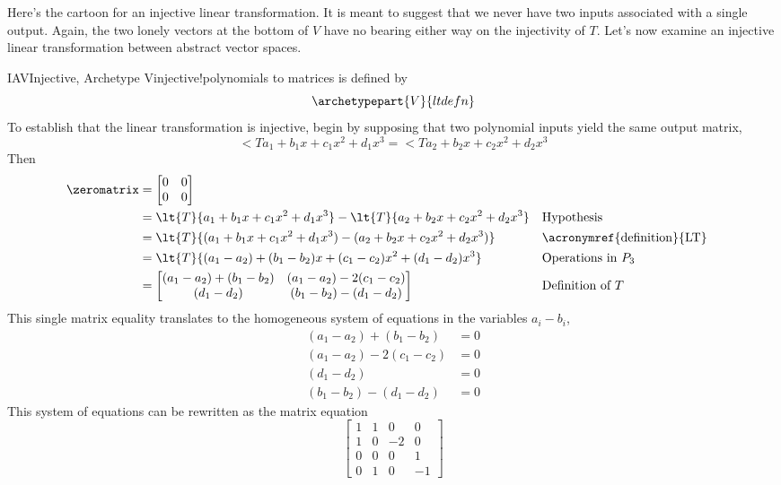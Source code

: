 %
Here's the cartoon for an injective linear transformation.  It is meant to suggest that we never have two inputs associated with a single output.  Again, the two lonely vectors at the bottom of $V$ have no bearing either way on the injectivity of $T$.
%
%
Let's now examine an injective linear transformation between abstract vector spaces.
%
\begin{example}{IAV}{Injective, Archetype V}{injective!polynomials to matrices}
 is defined by
%
\begin{equation*}
\archetypepart{V}{ltdefn}
\end{equation*}
%
To establish that the linear transformation is injective, begin by supposing that two polynomial inputs yield the same output matrix, 
%
\begin{equation*}
\lt{T}{a_1+b_1x+c_1x^2+d_1x^3}=\lt{T}{a_2+b_2x+c_2x^2+d_2x^3}
\end{equation*}
%
Then
%
\begin{align*}
\zeromatrix
&=\begin{bmatrix}
0&0\\0&0
\end{bmatrix}\\
&=\lt{T}{a_1+b_1x+c_1x^2+d_1x^3}-\lt{T}{a_2+b_2x+c_2x^2+d_2x^3}&&\text{Hypothesis}\\
&=\lt{T}{(a_1+b_1x+c_1x^2+d_1x^3)-(a_2+b_2x+c_2x^2+d_2x^3)}&&\text{\acronymref{definition}{LT}}\\
&=\lt{T}{(a_1-a_2)+(b_1-b_2)x+(c_1-c_2)x^2+(d_1-d_2)x^3}&&\text{Operations in $P_3$}\\
&=
\begin{bmatrix}
(a_1-a_2)+(b_1-b_2) & (a_1-a_2)-2(c_1-c_2)\\
(d_1-d_2) & (b_1-b_2)-(d_1-d_2)
\end{bmatrix}&&\text{Definition of $T$}
%
\end{align*}
%
This single matrix equality translates to the homogeneous system of equations in the variables $a_i-b_i$,
%
\begin{align*}
(a_1-a_2)+(b_1-b_2)&=0\\
(a_1-a_2)-2(c_1-c_2)&=0\\
(d_1-d_2)&=0\\
(b_1-b_2)-(d_1-d_2)&=0
\end{align*}
%
This system of equations can be rewritten as the matrix equation
%
\begin{equation*}
\begin{bmatrix}
1&1&0&0\\1&0&-2&0\\0&0&0&1\\0&1&0&-1

\end{bmatrix}
\end{equation*}
\end{example}
